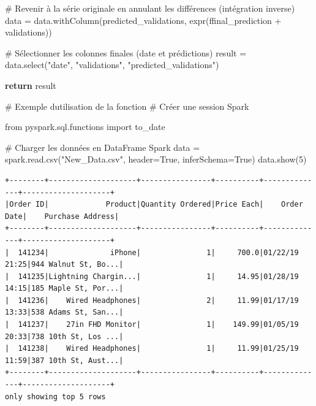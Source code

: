 \documentclass[
  letterpaper,
  DIV=11,
  numbers=noendperiod]{scrartcl}
\newenvironment{Shaded}{\begin{snugshade}}{\end{snugshade}}
\newcommand{\CommentTok}[1]{\textcolor[rgb]{0.37,0.37,0.37}{#1}}
\newcommand{\ControlFlowTok}[1]{\textcolor[rgb]{0.00,0.23,0.31}{\textbf{#1}}}
\newcommand{\DecValTok}[1]{\textcolor[rgb]{0.68,0.00,0.00}{#1}}
\newcommand{\ImportTok}[1]{\textcolor[rgb]{0.00,0.46,0.62}{#1}}
\newcommand{\NormalTok}[1]{\textcolor[rgb]{0.00,0.23,0.31}{#1}}
\newcommand{\OperatorTok}[1]{\textcolor[rgb]{0.37,0.37,0.37}{#1}}
\newcommand{\SpecialStringTok}[1]{\textcolor[rgb]{0.13,0.47,0.30}{#1}}
\newcommand{\StringTok}[1]{\textcolor[rgb]{0.13,0.47,0.30}{#1}}
\newcommand{\VariableTok}[1]{\textcolor[rgb]{0.07,0.07,0.07}{#1}}
\begin{document}
\begin{Shaded}
\begin{Highlighting}[]
    \CommentTok{\# Revenir à la série originale en annulant les différences (intégration inverse)}
\NormalTok{    data }\OperatorTok{=}\NormalTok{ data.withColumn(}\StringTok{\textquotesingle{}predicted\_validations\textquotesingle{}}\NormalTok{, expr(}\SpecialStringTok{f\textquotesingle{}final\_prediction + validations\textquotesingle{}}\NormalTok{))}
    
    \CommentTok{\# Sélectionner les colonnes finales (date et prédictions)}
\NormalTok{    result }\OperatorTok{=}\NormalTok{ data.select(}\StringTok{"date"}\NormalTok{, }\StringTok{"validations"}\NormalTok{, }\StringTok{"predicted\_validations"}\NormalTok{)}
    
    \ControlFlowTok{return}\NormalTok{ result}

\CommentTok{\# Exemple d\textquotesingle{}utilisation de la fonction}
\CommentTok{\# Créer une session Spark}
\end{Highlighting}
\end{Shaded}

\begin{Shaded}
\begin{Highlighting}[]
\ImportTok{from}\NormalTok{ pyspark.sql.functions }\ImportTok{import}\NormalTok{ to\_date}
\end{Highlighting}
\end{Shaded}

\begin{Shaded}
\begin{Highlighting}[]

\CommentTok{\# Charger les données en DataFrame Spark}
\NormalTok{data }\OperatorTok{=}\NormalTok{ spark.read.csv(}\StringTok{"New\_Data.csv"}\NormalTok{, header}\OperatorTok{=}\VariableTok{True}\NormalTok{, inferSchema}\OperatorTok{=}\VariableTok{True}\NormalTok{)}
\NormalTok{data.show(}\DecValTok{5}\NormalTok{)}
\end{Highlighting}
\end{Shaded}

\begin{verbatim}
+--------+--------------------+----------------+----------+--------------+--------------------+
|Order ID|             Product|Quantity Ordered|Price Each|    Order Date|    Purchase Address|
+--------+--------------------+----------------+----------+--------------+--------------------+
|  141234|              iPhone|               1|     700.0|01/22/19 21:25|944 Walnut St, Bo...|
|  141235|Lightning Chargin...|               1|     14.95|01/28/19 14:15|185 Maple St, Por...|
|  141236|    Wired Headphones|               2|     11.99|01/17/19 13:33|538 Adams St, San...|
|  141237|    27in FHD Monitor|               1|    149.99|01/05/19 20:33|738 10th St, Los ...|
|  141238|    Wired Headphones|               1|     11.99|01/25/19 11:59|387 10th St, Aust...|
+--------+--------------------+----------------+----------+--------------+--------------------+
only showing top 5 rows
\end{verbatim}
\end{document}
